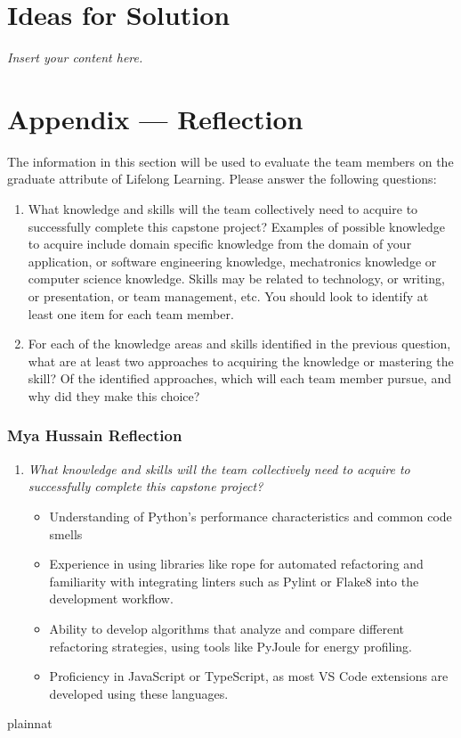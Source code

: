 \documentclass[12pt]{article}
\newcommand{\lips}{\textit{Insert your content here.}}
\begin{document}
\section{Ideas for Solution}
\lips

\newpage{}
\section*{Appendix --- Reflection}

The information in this section will be used to evaluate the team members on the
graduate attribute of Lifelong Learning.  Please answer the following questions:

\begin{enumerate}
  \item What knowledge and skills will the team collectively need to acquire to
  successfully complete this capstone project?  Examples of possible knowledge
  to acquire include domain specific knowledge from the domain of your
  application, or software engineering knowledge, mechatronics knowledge or
  computer science knowledge.  Skills may be related to technology, or writing,
  or presentation, or team management, etc.  You should look to identify at
  least one item for each team member.
  \item For each of the knowledge areas and skills identified in the previous
  question, what are at least two approaches to acquiring the knowledge or
  mastering the skill?  Of the identified approaches, which will each team
  member pursue, and why did they make this choice?
\end{enumerate}

\subsubsection*{Mya Hussain Reflection}
\begin{enumerate}
  \item \textit{What knowledge and skills will the team collectively need to acquire to successfully complete this capstone project?}

    \begin{itemize}
      \item Understanding of Python's performance characteristics and common code smells
      \item Experience in using libraries like rope for automated refactoring and familiarity with integrating linters such as Pylint or Flake8 into the development workflow.
      \item Ability to develop algorithms that analyze and compare different refactoring strategies, using tools like PyJoule for energy profiling.
      \item  Proficiency in JavaScript or TypeScript, as most VS Code extensions are developed using these languages.
    \end{itemize}
 
\end{enumerate}

 {plainnat}

\end{document}
